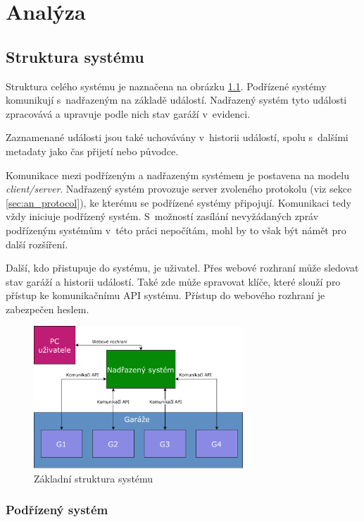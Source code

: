 \chapter{Analýza}
\label{sec:an}

\section{Struktura systému}
\label{sec:an_struct}

Struktura celého systému je naznačena na obrázku \ref{fig:basic_struct}. Podřízené systémy komunikují s~nadřazeným na základě událostí. Nadřazený systém tyto události zpracovává a upravuje podle nich stav garáží v~evidenci. 

Zaznamenané události jsou také uchovávány v~historii událostí, spolu s~dalšími metadaty jako čas přijetí nebo původce.

Komunikace mezi podřízeným a nadřazeným systémem je postavena na modelu \textit{client/server}. Nadřazený systém provozuje server zvoleného protokolu (viz sekce \ref{sec:an_protocol}), ke kterému se podřízené systémy připojují. Komunikaci tedy vždy iniciuje podřízený systém. S~možností zasílání nevyžádaných zpráv podřízeným systémům v~této práci nepočítám, mohl by to však být námět pro další rozšíření.

Další, kdo přistupuje do systému, je uživatel. Přes webové rozhraní může sledovat stav garáží a historii událostí. Také zde může spravovat klíče, které slouží pro přístup ke komunikačnímu API systému. Přístup do webového rozhraní je zabezpečen heslem.

\begin{figure}[h!]
    \centering
    \includegraphics[width=0.7\textwidth]{images/basic_struct.pdf}
    \caption{Základní struktura systému}
    \label{fig:basic_struct}
\end{figure}

\subsection{Podřízený systém}

